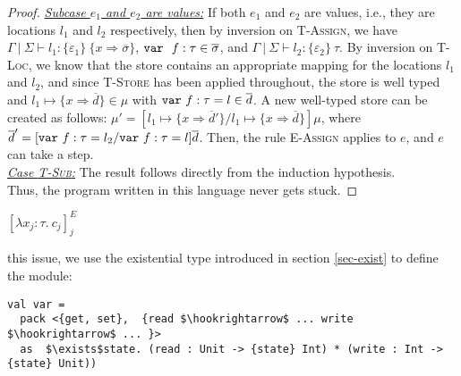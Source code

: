\begin{proof}
\underline{\textit{Subcase $e_1$ and $e_2$ are values:}} If both $e_1$ and $e_2$ are values, i.e., they are locations $l_1$ and $l_2$ respectively, then by inversion on \textsc{T-Assign}, we have $\Gamma~|~\Sigma \vdash l_1 : \{ \varepsilon_1 \}~\{ x \Rightarrow \overline{\sigma} \}$, $\mathtt{var}~~ f : \tau \in \overline{\sigma}$, and $\Gamma~|~\Sigma \vdash l_2 : \{ \varepsilon_2 \}~\tau$. By inversion on \textsc{T-Loc}, we know that the store contains an appropriate mapping for the locations $l_1$ and $l_2$, and since \textsc{T-Store} has been applied throughout, the store is well typed and $l_1 \mapsto \{ x \Rightarrow \overline{d} \} \in \mu$ with $\mathtt{var}~ f : \tau = l \in \overline{d}$. A new well-typed store can be created as follows: $\mu' = [l_1 \mapsto \{ x \Rightarrow \overline{d}' \}/l_1 \mapsto \{ x \Rightarrow \overline{d} \}]\mu$, where $\overline{d}' = [\mathtt{var}~ f : \tau = l_2/\mathtt{var}~ f : \tau = l]\overline{d}$. Then, the rule \textsc{E-Assign} applies to $e$, and $e$ can take a step.
\\

\noindent\underline{\textit{Case \textsc{T-Sub}:}}
The result follows directly from the induction hypothesis.
\\

\noindent Thus, the program written in this language never gets stuck.
\end{proof}

$[\lambda x_j : \tau.\ c_j]_j^E$

this issue, we use the existential type introduced in section \ref{sec-exist} to define the module:
\begin{lstlisting}[mathescape=true]
val var = 
  pack <{get, set},  {read $\hookrightarrow$ ... write $\hookrightarrow$ ... }>
  as  $\exists$state. (read : Unit -> {state} Int) * (write : Int -> {state} Unit))
\end{lstlisting}



